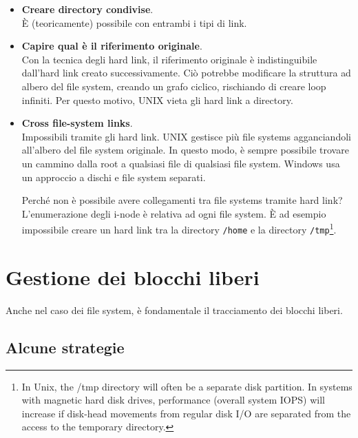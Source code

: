 \documentclass{report}
\begin{document}
\begin{itemize}
    \item \textbf{Creare directory condivise}.\\
    È (teoricamente) possibile con entrambi i tipi di link.
    
    \item \textbf{Capire qual è il riferimento originale}.\\
    Con la tecnica degli hard link, il riferimento originale è indistinguibile dall'hard link creato successivamente. Ciò potrebbe modificare la struttura ad albero del file system, creando un grafo ciclico, rischiando di creare loop infiniti. Per questo motivo, UNIX vieta gli hard link a directory.

    \item \textbf{Cross file-system links}.\\
    Impossibili tramite gli hard link. UNIX gestisce più file systems agganciandoli all'albero del file system originale. In questo modo, è sempre possibile trovare un cammino dalla root a qualsiasi file di qualsiasi file system. Windows usa un approccio a dischi e file system separati.

    Perché non è possibile avere collegamenti tra file systems tramite hard link? L'enumerazione degli i-node è relativa ad ogni file system. È ad esempio impossibile creare un hard link tra la directory \verb|/home| e la directory \verb|/tmp|\footnote{In Unix, the /tmp directory will often be a separate disk partition. In systems with magnetic hard disk drives, performance (overall system IOPS) will increase if disk-head movements from regular disk I/O are separated from the access to the temporary directory.}.
\end{itemize}

\newpage

\section{Gestione dei blocchi liberi}
Anche nel caso dei file system, è fondamentale il tracciamento dei blocchi liberi.
\subsection{Alcune strategie}
\end{document}
